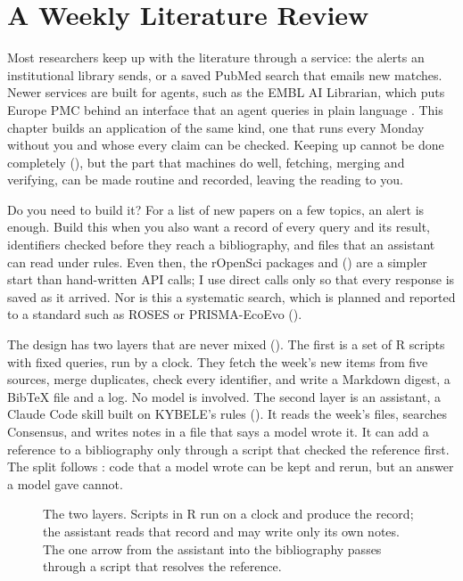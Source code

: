 \chapter{A Weekly Literature Review}
\label{ch:weeklyliterature}

Most researchers keep up with the literature through a service: the alerts an
institutional library sends, or a saved PubMed search that emails new
matches. Newer services are built for agents, such as the EMBL AI Librarian,
which puts Europe PMC behind an interface that an agent queries in plain
language \parencite{sigillo2026embllibrarian}. This chapter builds an
application of the same kind, one that runs every Monday without you and
whose every claim can be checked. Keeping up cannot be done completely (),
but the part that machines do well, fetching, merging and verifying, can be
made routine and recorded, leaving the reading to you.

Do you need to build it? For a list of new papers on a few topics, an alert
is enough. Build this when you also want a record of every query and its
result, identifiers checked before they reach a bibliography, and files that
an assistant can read under rules. Even then, the rOpenSci packages
 and  () are a simpler
start than hand-written API calls; I use direct calls only so that every
response is saved as it arrived. Nor is this a systematic search, which is
planned and reported to a standard such as ROSES
\parencite{haddaway2018roses} or PRISMA-EcoEvo
\parencite{odea2021prismaecoevo} ().

The design has two layers that are never mixed (). The
first is a set of R scripts with fixed queries, run by a clock. They fetch the
week's new items from five sources, merge duplicates, check every identifier,
and write a Markdown digest, a BibTeX file and a log. No model is involved.
The second layer is an assistant, a Claude Code skill built on KYBELE's rules
(). It reads the week's files, searches Consensus, and
writes notes in a file that says a model wrote it. It can add a reference to
a bibliography only through a script that checked the reference first. The
split follows : code that a model wrote can be kept
and rerun, but an answer a model gave cannot.

\begin{figure}[htbp]
\centering
{}
\caption{The two layers. Scripts in R run on a clock and produce the record;
the assistant reads that record and may write only its own notes. The one
arrow from the assistant into the bibliography passes through a script that
resolves the reference.}
\label{fig:twolayers}
\end{figure}

